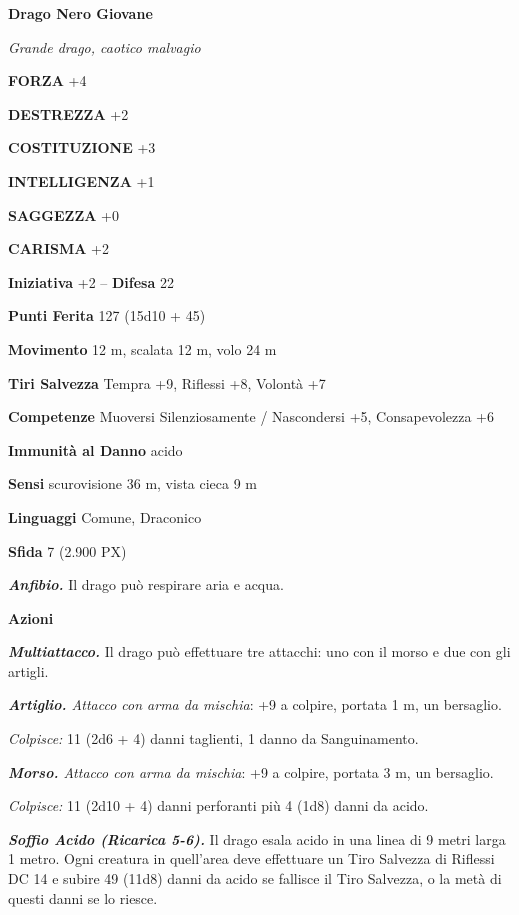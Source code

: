 \begin{multicols}{2}
	\medskip{}\textbf{Drago Nero Giovane}

	\textit{Grande drago, caotico malvagio}

	\textbf{FORZA} +4

	\textbf{DESTREZZA} +2

	\textbf{COSTITUZIONE} +3

	\textbf{INTELLIGENZA} +1

	\textbf{SAGGEZZA} +0

	\textbf{CARISMA} +2

	\textbf{Iniziativa} +2 -- \textbf{Difesa} 22

	\textbf{Punti Ferita} 127 (15d10 + 45)

	\textbf{Movimento} 12 m, scalata 12 m, volo 24 m

	\textbf{Tiri Salvezza} Tempra +9, Riflessi +8, Volontà +7

	\textbf{Competenze} Muoversi Silenziosamente / Nascondersi +5, Consapevolezza +6

	\textbf{Immunità al Danno} acido

	\textbf{Sensi} scurovisione 36 m, vista cieca 9 m

	\textbf{Linguaggi} Comune, Draconico

	\textbf{Sfida} 7 (2.900 PX)

	\textit{\textbf{Anfibio.}} Il drago può respirare aria e acqua.

	\textbf{Azioni}

	\textit{\textbf{Multiattacco.}} Il drago può effettuare tre attacchi: uno con il morso e due con gli artigli.

	\textit{\textbf{Artiglio.} Attacco con arma da mischia}: +9 a colpire, portata 1 m, un bersaglio.

	\textit{Colpisce:} 11 (2d6 + 4) danni taglienti, 1 danno da Sanguinamento.

	\textit{\textbf{Morso.} Attacco con arma da mischia}: +9 a colpire, portata 3 m, un bersaglio.

	\textit{Colpisce:} 11 (2d10 + 4) danni perforanti più 4 (1d8) danni da acido.

	\textit{\textbf{Soffio Acido (Ricarica 5-6).}} Il drago esala acido in una linea di 9 metri larga 1 metro. Ogni creatura in quell'area deve effettuare un Tiro Salvezza di Riflessi DC 14 e subire 49 (11d8) danni da acido se fallisce il Tiro Salvezza, o la metà di questi danni se lo riesce.


\end{multicols}
